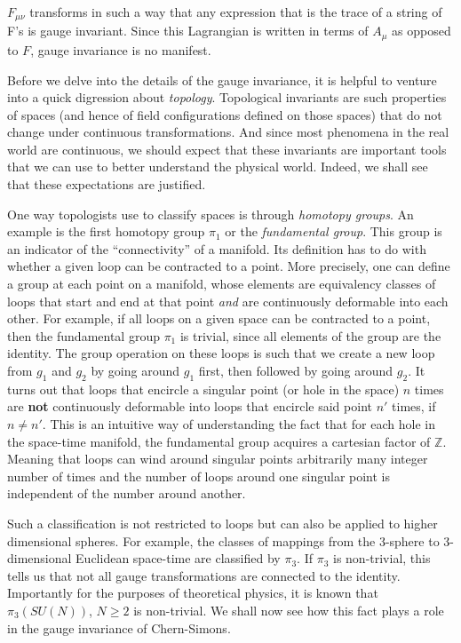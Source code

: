     $F_{\mu \nu}$ transforms in such a way that any expression that is the trace of a string of F's is gauge invariant. Since this Lagrangian is written in terms of $A_{\mu}$ as opposed to $F$, gauge invariance is no manifest.

    Before we delve into the details of the gauge invariance, it is helpful to venture into a quick digression about \textit{topology}. Topological invariants are such properties of spaces (and hence of field configurations defined on those spaces) that do not change under continuous transformations. And since most phenomena in the real world are continuous, we should expect that these invariants are important tools that we can use to better understand the physical world. Indeed, we shall see that these expectations are justified. 

    One way topologists use to classify spaces is through \textit{homotopy groups}. An example is the first homotopy group $\pi_1$ or the \textit{fundamental group}. This group is an indicator of the ``connectivity'' of a manifold. Its definition has to do with whether a given loop can be contracted to a point. More precisely, one can define a group at each point on a manifold, whose elements are equivalency classes of loops that start and end at that point \textit{and} are continuously deformable into each other. For example, if all loops on a given space can be contracted to a point, then the fundamental group $\pi_1$ is trivial, since all elements of the group are the identity. The group operation on these loops is such that we create a new loop from $g_1$ and $g_2$ by going around $g_1$ first, then followed by going around $g_2$. It turns out that loops that encircle a singular point (or hole in the space) $n$ times are \textbf{not} continuously deformable into loops that encircle said point $n'$ times, if $n \neq n'$. This is an intuitive way of understanding the fact that for each hole in the space-time manifold, the fundamental group acquires a cartesian factor of $\mathbb{Z}$. Meaning that loops can wind around singular points arbitrarily many integer number of times and the number of loops around one singular point is independent of the number around another.

    Such a classification is not restricted to loops but can also be applied to higher dimensional spheres. For example, the classes of mappings from the 3-sphere to 3-dimensional Euclidean space-time are classified by $\pi_3$. If $\pi_3$ is non-trivial, this tells us that not all gauge transformations are connected to the identity. Importantly for the purposes of theoretical physics, it is known that $\pi_3\left(SU(N) \right)$, $N\geq2$ is non-trivial. We shall now see how this fact plays a role in the gauge invariance of Chern-Simons.

